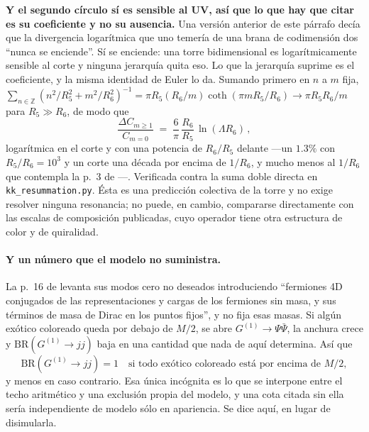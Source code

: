 \documentclass[11pt,a4paper]{article}
\newcommand{\ZZ}{\mathbb{Z}}
\begin{document}
\noindent\textbf{Y el segundo círculo sí es sensible al UV, así que lo que hay que citar es su
coeficiente y no su ausencia.} Una versión anterior de este párrafo decía que la divergencia
logarítmica que uno temería de una brana de codimensión dos ``nunca se enciende''. Sí se
enciende: una torre bidimensional es logarítmicamente sensible al corte y ninguna jerarquía
quita eso. Lo que la jerarquía suprime es el coeficiente, y la misma identidad de Euler lo da.
Sumando primero en $n$ a $m$ fija, $\sum_{n\in\ZZ}(n^2/R_5^2+m^2/R_6^2)^{-1}=\pi R_5(R_6/m)
\coth(\pi mR_5/R_6)\to\pi R_5R_6/m$ para $R_5\gg R_6$, de modo que
\begin{equation}\label{eq:codim2}
  \frac{\Delta C_{m\ge1}}{C_{m=0}}\;=\;\frac{6}{\pi}\,\frac{R_6}{R_5}\,\ln(\Lambda R_6)\,,
\end{equation}
logarítmica en el corte y con una potencia de $R_6/R_5$ delante ---un $1.3\%$ con
$R_5/R_6=10^3$ y un corte una década por encima de $1/R_6$, y mucho menos al $1/R_6$ que
contempla la p.~3 de \cite{KM25}---. Verificada contra la suma doble directa en
\texttt{kk\_\allowbreak resummation.py}. Ésta es una predicción
colectiva de la torre y no exige resolver ninguna resonancia; no puede, en cambio, compararse
directamente con las escalas de composición publicadas, cuyo operador tiene otra estructura de
color y de quiralidad.

\paragraph{Y un número que el modelo no suministra.} La p.~16 de \cite{KM25} levanta sus modos cero
no deseados introduciendo ``fermiones 4D conjugados de las representaciones y cargas de los
fermiones sin masa, y sus términos de masa de Dirac en los puntos fijos'', y no fija esas masas. Si algún exótico
coloreado queda por debajo de $M/2$, se abre $G^{(1)}\to\Psi\bar\Psi$, la anchura crece y
$\mathrm{BR}(G^{(1)}\to jj)$ baja en una cantidad que nada de aquí determina. Así que
\begin{equation}\label{eq:brhole}
  \mathrm{BR}(G^{(1)}\to jj)=1 \quad\text{si todo exótico coloreado está por encima de } M/2,
\end{equation}
y menos en caso contrario. Esa única incógnita es lo que se interpone entre el techo aritmético y
una exclusión propia del modelo, y una cota citada sin ella sería independiente de modelo sólo en
apariencia. Se dice aquí, en lugar de disimularla.
\end{document}
